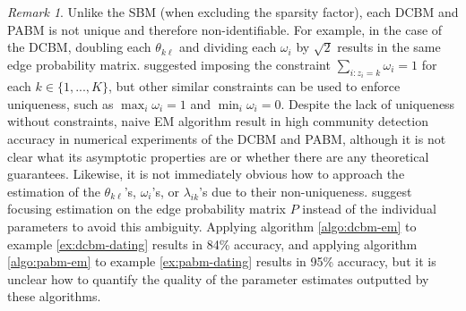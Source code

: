 \documentclass[
  12pt,
]{article}
\theoremstyle{definition}
\theoremstyle{definition}
\theoremstyle{definition}
\theoremstyle{definition}
\theoremstyle{remark}
\newtheorem{remark}{Remark}
\begin{document}
\begin{remark}
Unlike the SBM (when excluding the sparsity factor), each DCBM and PABM is not unique and therefore non-identifiable. 
For example, in the case of the DCBM, doubling each $\theta_{k \ell}$ and dividing each $\omega_i$ by $\sqrt{2}$ results in the same edge probability matrix. 
\citet{Karrer_2011} suggested imposing the constraint $\sum_{i : z_i = k} \omega_i = 1$ for each $k \in \{1, ..., K\}$, but other similar constraints can be used to enforce uniqueness, such as $\max_i \omega_i = 1$ and $\min_i \omega_i = 0$. 
Despite the lack of uniqueness without constraints, naive EM algorithm result in high community detection accuracy in numerical experiments of the DCBM and PABM, although it is not clear what its asymptotic properties are or whether there are any theoretical guarantees. 
Likewise, it is not immediately obvious how to approach the estimation of the $\theta_{k \ell}$'s, $\omega_i$'s, or $\lambda_{ik}$'s due to their non-uniqueness. 
\citet{noroozi2019estimation} suggest focusing estimation on the edge probability matrix $P$ instead of the individual parameters to avoid this ambiguity. 
Applying algorithm \ref{algo:dcbm-em} to example \ref{ex:dcbm-dating} results in 84\% accuracy, and applying algorithm \ref{algo:pabm-em} to example \ref{ex:pabm-dating} results in 95\% accuracy, but it is unclear how to quantify the quality of the parameter estimates outputted by these algorithms. 
\end{remark}
\end{document}

